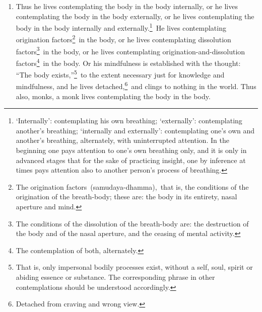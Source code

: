 \begin{enumerate}[resume]
\item Thus he lives contemplating the body in the body internally, or he lives contemplating the body in the body externally, or he lives contemplating the body in the body internally and externally.\footnote{‘Internally’: contemplating his own breathing; ‘externally’: contemplating another’s breathing; ‘internally and externally’: contemplating one’s own and another’s breathing, alternately, with uninterrupted attention. In the beginning one pays attention to one’s own breathing only, and it is only in advanced stages that for the sake of practicing insight, one by inference at times pays attention also to another person’s process of breathing.} He lives contemplating origination factors\footnote{The origination factors (samudaya-dhamma), that is, the conditions of the origination of the breath-body; these are: the body in its entirety, nasal aperture and mind.} in the body, or he lives contemplating dissolution factors\footnote{The conditions of the dissolution of the breath-body are: the destruction of the body and of the nasal aperture, and the ceasing of mental activity.} in the body, or he lives contemplating origination-and-dissolution factors\footnote{The contemplation of both, alternately.} in the body. Or his mindfulness is established with the thought: “The body exists,”\footnote{That is, only impersonal bodily processes exist, without a self, soul, spirit or abiding essence or substance. The corresponding phrase in other contemplations should be understood accordingly.} to the extent necessary just for knowledge and mindfulness, and he lives detached,\footnote{Detached from craving and wrong view.} and clings to nothing in the world. Thus also, monks, a monk lives contemplating the body in the body.
\end{enumerate}

